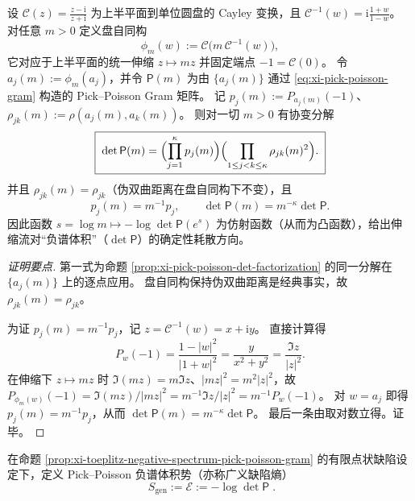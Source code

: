 \begin{proposition}\label{prop:xi-pick-poisson-det-scaling-law}
设 \(\mathcal{C}(z)=\frac{z-\mathrm{i}}{z+\mathrm{i}}\) 为上半平面到单位圆盘的 Cayley 变换，且 \(\mathcal{C}^{-1}(w)=\mathrm{i}\frac{1+w}{1-w}\)。
对任意 \(m>0\) 定义盘自同构
\[
\phi_m(w):=\mathcal{C}\!\bigl(m\,\mathcal{C}^{-1}(w)\bigr),
\]
它对应于上半平面的统一伸缩 \(z\mapsto mz\) 并固定端点 \(-1=\mathcal{C}(0)\)。
令 \(a_j(m):=\phi_m(a_j)\)，并令 \(\mathsf P(m)\) 为由 \(\{a_j(m)\}\) 通过 \eqref{eq:xi-pick-poisson-gram} 构造的 Pick--Poisson Gram 矩阵。
记 \(p_j(m):=P_{a_j(m)}(-1)\)、\(\rho_{jk}(m):=\rho(a_j(m),a_k(m))\)。
则对一切 \(m>0\) 有协变分解
\[
\boxed{\;
\det\mathsf P(m)
=\Bigl(\prod_{j=1}^{\kappa}p_j(m)\Bigr)\Bigl(\prod_{1\le j<k\le\kappa}\rho_{jk}(m)^2\Bigr).\;}
\]
并且 \(\rho_{jk}(m)=\rho_{jk}\)（伪双曲距离在盘自同构下不变），且
\[
\boxed{\;p_j(m)=m^{-1}p_j,\qquad \det\mathsf P(m)=m^{-\kappa}\det\mathsf P.\;}
\]
因此函数 \(s=\log m\mapsto -\log\det\mathsf P(e^s)\) 为仿射函数（从而为凸函数），给出伸缩流对“负谱体积”（\(\det\mathsf P\)）的确定性耗散方向。
\end{proposition}
\begin{proof}[证明要点]
第一式为命题 \ref{prop:xi-pick-poisson-det-factorization} 的同一分解在 \(\{a_j(m)\}\) 上的逐点应用。
盘自同构保持伪双曲距离是经典事实，故 \(\rho_{jk}(m)=\rho_{jk}\)。
\par
为证 \(p_j(m)=m^{-1}p_j\)，记 \(z=\mathcal{C}^{-1}(w)=x+\mathrm{i}y\)。
直接计算得
\[
P_{w}(-1)=\frac{1-|w|^2}{|1+w|^2}
=\frac{y}{x^2+y^2}
=\frac{\Im z}{|z|^2}.
\]
在伸缩下 \(z\mapsto mz\) 时 \(\Im(mz)=m\Im z\)、\(|mz|^2=m^2|z|^2\)，故
\(
P_{\phi_m(w)}(-1)=\Im(mz)/|mz|^2=m^{-1}\Im z/|z|^2
=m^{-1}P_w(-1)
\)。
对 \(w=a_j\) 即得 \(p_j(m)=m^{-1}p_j\)，从而 \(\det\mathsf P(m)=m^{-\kappa}\det\mathsf P\)。
最后一条由取对数立得。证毕。
\end{proof}



\begin{definition}\label{def:xi-generalized-defect-entropy-logdet}
在命题 \ref{prop:xi-toeplitz-negative-spectrum-pick-poisson-gram} 的有限点状缺陷设定下，定义 Pick--Poisson 负谱体积势（亦称广义缺陷熵）
\[
\boxed{\;
S_{\mathrm{gen}}
:=\mathcal{E}
:=-\log\det\mathsf P\; }.
\]
\end{definition}


